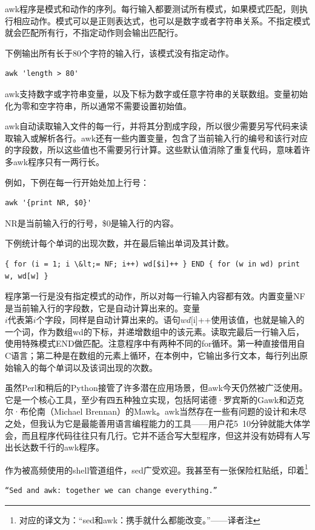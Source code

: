 \documentclass[a4paper,12pt,UTF8,twoside]{ctexbook}
\begin{document}
awk程序是模式和动作的序列。每行输入都要测试所有模式，如果模式匹配，则执行相应动作。模式可以是正则表达式，也可以是数字或者字符串关系。不指定模式就会匹配所有行，不指定动作则会输出匹配行。

下例输出所有长于80个字符的输入行，该模式没有指定动作。
\begin{lstlisting}
awk 'length > 80'
\end{lstlisting}
awk支持数字或字符串变量，以及下标为数字或任意字符串的关联数组。变量初始化为零和空字符串，所以通常不需要设置初始值。

awk自动读取输入文件的每一行，并将其分割成字段，所以很少需要另写代码来读取输入或解析各行。awk还有一些内置变量，包含了当前输入行的编号和该行对应的字段数，所以这些值也不需要另行计算。这些默认值消除了重复代码，意味着许多awk程序只有一两行长。

例如，下例在每一行开始处加上行号：
\begin{lstlisting}
awk '{print NR, $0}'
\end{lstlisting}
NR是当前输入行的行号，\$0是输入行的内容。

下例统计每个单词的出现次数，并在最后输出单词及其计数。
\begin{lstlisting}
{ for (i = 1; i \&lt;= NF; i++) wd[$i]++ } END { for (w in wd) print w, wd[w] }
\end{lstlisting}

程序第一行是没有指定模式的动作，所以对每一行输入内容都有效。内置变量NF是当前输入行的字段数，它是自动计算出来的。变量 $i代表第i个字段，同样是自动计算出来的。语句wd[$i]++使用该值，也就是输入的一个词，作为数组wd的下标，并递增数组中的该元素。读取完最后一行输入后，使用特殊模式END做匹配。注意程序中有两种不同的for循环。第一种直接借用自C语言；第二种是在数组的元素上循环，在本例中，它输出多行文本，每行列出原始输入的每个单词以及该词出现的次数。

虽然Perl和稍后的Python接管了许多潜在应用场景，但awk今天仍然被广泛使用。它是一个核心工具，至少有四五种独立实现，包括阿诺德·罗宾斯的Gawk和迈克尔·布伦南（Michael Brennan）的Mawk。awk当然存在一些有问题的设计和未尽之处，但我认为它是最能善用语言编程能力的工具——用户花5~10分钟就能大体学会，而且程序代码往往只有几行。它并不适合写大型程序，但这并没有妨碍有人写出长达数千行的awk程序。

作为被高频使用的shell管道组件，sed广受欢迎。我甚至有一张保险杠贴纸，印着\footnote{对应的译文为：“sed和awk：携手就什么都能改变。”——译者注}

\begin{lstlisting}
“Sed and awk: together we can change everything.”
\end{lstlisting}
\end{document}
